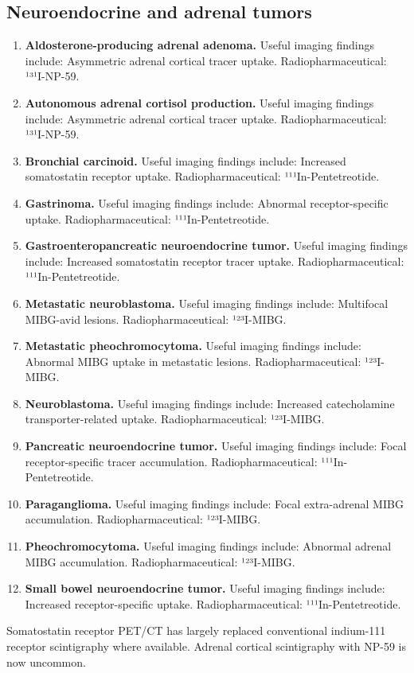 \subsection{Neuroendocrine and adrenal tumors}
\begin{enumerate}[leftmargin=*,itemsep=0.45em,topsep=0.4em]
\item \textbf{Aldosterone-producing adrenal adenoma.} Useful imaging findings include: Asymmetric adrenal cortical tracer uptake. Radiopharmaceutical: ¹³¹I-NP-59.
\item \textbf{Autonomous adrenal cortisol production.} Useful imaging findings include: Asymmetric adrenal cortical tracer uptake. Radiopharmaceutical: ¹³¹I-NP-59.
\item \textbf{Bronchial carcinoid.} Useful imaging findings include: Increased somatostatin receptor uptake. Radiopharmaceutical: ¹¹¹In-Pentetreotide.
\item \textbf{Gastrinoma.} Useful imaging findings include: Abnormal receptor-specific uptake. Radiopharmaceutical: ¹¹¹In-Pentetreotide.
\item \textbf{Gastroenteropancreatic neuroendocrine tumor.} Useful imaging findings include: Increased somatostatin receptor tracer uptake. Radiopharmaceutical: ¹¹¹In-Pentetreotide.
\item \textbf{Metastatic neuroblastoma.} Useful imaging findings include: Multifocal MIBG-avid lesions. Radiopharmaceutical: ¹²³I-MIBG.
\item \textbf{Metastatic pheochromocytoma.} Useful imaging findings include: Abnormal MIBG uptake in metastatic lesions. Radiopharmaceutical: ¹²³I-MIBG.
\item \textbf{Neuroblastoma.} Useful imaging findings include: Increased catecholamine transporter-related uptake. Radiopharmaceutical: ¹²³I-MIBG.
\item \textbf{Pancreatic neuroendocrine tumor.} Useful imaging findings include: Focal receptor-specific tracer accumulation. Radiopharmaceutical: ¹¹¹In-Pentetreotide.
\item \textbf{Paraganglioma.} Useful imaging findings include: Focal extra-adrenal MIBG accumulation. Radiopharmaceutical: ¹²³I-MIBG.
\item \textbf{Pheochromocytoma.} Useful imaging findings include: Abnormal adrenal MIBG accumulation. Radiopharmaceutical: ¹²³I-MIBG.
\item \textbf{Small bowel neuroendocrine tumor.} Useful imaging findings include: Increased receptor-specific uptake. Radiopharmaceutical: ¹¹¹In-Pentetreotide.
\end{enumerate}
Somatostatin receptor PET/CT has largely replaced conventional indium-111 receptor scintigraphy where available. Adrenal cortical scintigraphy with NP-59 is now uncommon.

